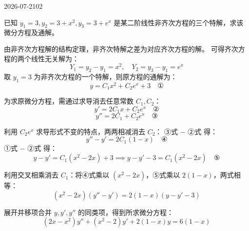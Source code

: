 \begin{mistake}{2026-07-21}{02}

\begin{problemcontent}
已知 \(y_1 = 3, y_2 = 3 + x^2, y_3 = 3 + e^x\) 是某二阶线性非齐次方程的三个特解，求该微分方程及通解。
\end{problemcontent}

\begin{solutioncontent}
由非齐次方程解的结构定理，非齐次特解之差为对应齐次方程的解。
可得齐次方程的两个线性无关解为：
\[ Y_1 = y_2 - y_1 = x^2, \quad Y_2 = y_3 - y_1 = e^x \]
取 \(y_1 = 3\) 为非齐次方程的一个特解，则原方程的通解为：
\[ y = C_1 x^2 + C_2 e^x + 3 \quad \text{①} \]

为求原微分方程，需通过求导消去任意常数 \(C_1, C_2\)：
\[ y' = 2C_1 x + C_2 e^x \quad \text{②} \]
\[ y'' = 2C_1 + C_2 e^x \quad \text{③} \]

利用 \(C_2 e^x\) 求导形式不变的特点，两两相减消去 \(C_2\)：
③式 \(-\) ②式 得：
\[ y'' - y' = 2C_1(1 - x) \quad \text{④} \]
①式 \(-\) ②式 得：
\[ y - y' = C_1(x^2 - 2x) + 3 \implies y - y' - 3 = C_1(x^2 - 2x) \quad \text{⑤} \]

利用交叉相乘消去 \(C_1\)：将④式乘以 \((x^2 - 2x)\)，⑤式乘以 \(2(1 - x)\)，两式相等：
\[ (x^2 - 2x)(y'' - y') = 2(1 - x)(y - y' - 3) \]

展开并移项合并 \(y, y', y''\) 的同类项，得到所求微分方程：
\[ (2x - x^2)y'' + (x^2 - 2)y' + 2(1 - x)y = 6(1 - x) \]
\end{solutioncontent}


\end{mistake}
